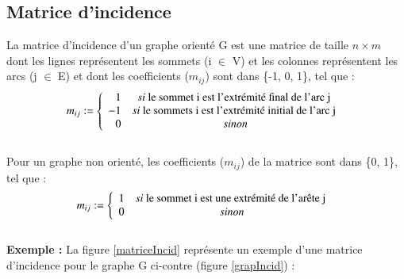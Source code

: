 			\subsection{Matrice d'incidence}
			La matrice d'incidence d'un graphe orienté  G est une matrice de taille $n \times m$  dont les lignes représentent les sommets (i $\in$ V) et les colonnes représentent les arcs (j $\in$ E) et dont les coefficients (${m}_{ij}$) sont dans \{-1, 0, 1\}, tel que \citep{hennecart2012elements} \citep{mathieu} :
			\[{m}_{ij} :=
			\left\{
			\begin{array}{r c l}
			1 & si $ le sommet i est l'extrémité final de 					l'arc j $ \\
			
			-1 & si $ le sommets i est l'extrémité initial de 				l'arc j $ \\
			0 & sinon \\
			\end{array}
			\right.
			\]
			\\
Pour un graphe non orienté, les coefficients (${m}_{ij}$) de la matrice sont dans \{0, 1\}, tel que \citep{hennecart2012elements} :
			\[{m}_{ij} :=
			\left\{
			\begin{array}{r c l}
			1 & si $ le sommet i est une extrémité					de l'arête j $ \\
			0 & sinon \\
			\end{array}
			\right.
			\]
			\\
\textbf{Exemple :} La figure \ref{matriceIncid} représente 					un exemple d'une matrice d'incidence pour le graphe G ci-contre 			(figure \ref{grapIncid}) :
			
